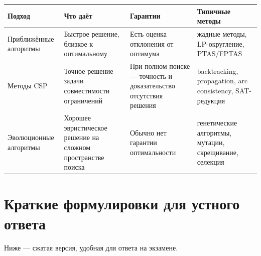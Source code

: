 \documentclass[12pt,a4paper]{article}
\theoremstyle{definition}
\theoremstyle{plain}
\begin{document}
\begin{center}
\begin{tabular}{|>{\raggedright\arraybackslash}p{3.7cm}|>{\raggedright\arraybackslash}p{4.1cm}|>{\raggedright\arraybackslash}p{4.1cm}|>{\raggedright\arraybackslash}p{3.6cm}|}
\hline
\textbf{Подход} & \textbf{Что даёт} & \textbf{Гарантии} & \textbf{Типичные методы} \\
\hline
Приближённые алгоритмы & Быстрое решение, близкое к оптимальному & Есть оценка отклонения от оптимума & жадные методы, LP-округление, PTAS/FPTAS \\
\hline
Методы CSP & Точное решение задачи совместимости ограничений & При полном поиске --- точность и доказательство отсутствия решения & backtracking, propagation, arc consistency, SAT-редукция \\
\hline
Эволюционные алгоритмы & Хорошее эвристическое решение на сложном пространстве поиска & Обычно нет гарантии оптимальности & генетические алгоритмы, мутации, скрещивание, селекция \\
\hline
\end{tabular}
\end{center}

\section{Краткие формулировки для устного ответа}

Ниже --- сжатая версия, удобная для ответа на экзамене.
\end{document}
